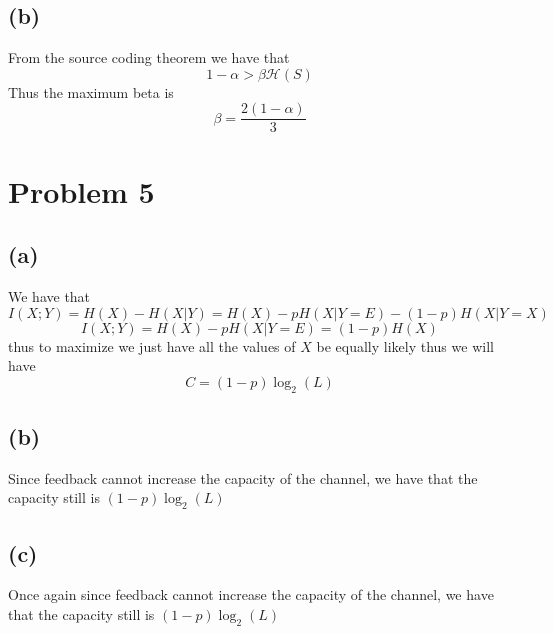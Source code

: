 \subsection*{(b)}
From the source coding theorem we have that 
$$1-\alpha>\beta\mathcal{H}(S)$$
Thus the maximum beta is
$$\beta=\boxed{\frac{2(1-\alpha)}{3}}$$
\section*{Problem 5}
\subsection*{(a)}
We have that 
$$I(X;Y)=H(X)-H(X|Y)=H(X)-pH(X|Y=E)-(1-p)H(X|Y=X)$$
$$I(X;Y)=H(X)-pH(X|Y=E)=(1-p)H(X)$$
thus to maximize we just have all the values of $X$ be equally likely
thus we will have
$$\boxed{C=(1-p)\log_2(L)}$$
\subsection*{(b)}
Since feedback cannot increase the capacity of the channel, we have that
the capacity still is $\boxed{(1-p)\log_2(L)}$
\subsection*{(c)}
Once again since feedback cannot increase the capacity of the channel, we have that
the capacity still is $\boxed{(1-p)\log_2(L)}$


